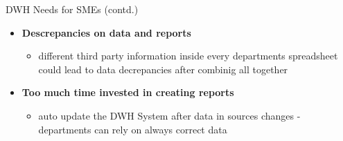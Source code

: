 \documentclass[aspectratio=169]{beamer}
\begin{document}
  \begin{frame}{DWH Needs for SMEs (contd.)}
    \begin{itemize}
      \item \textbf{Descrepancies on data and reports}
      	\begin{itemize}
      	   \item different third party information inside every departments spreadsheet could lead to data decrepancies after combinig all together
      	\end{itemize}
      \item \textbf{Too much time invested in creating reports}
        \begin{itemize}
      	   \item auto update the DWH System after data in sources changes - departments can rely on always correct data
      	\end{itemize}
    \end{itemize}
  \end{frame}
\end{document}
